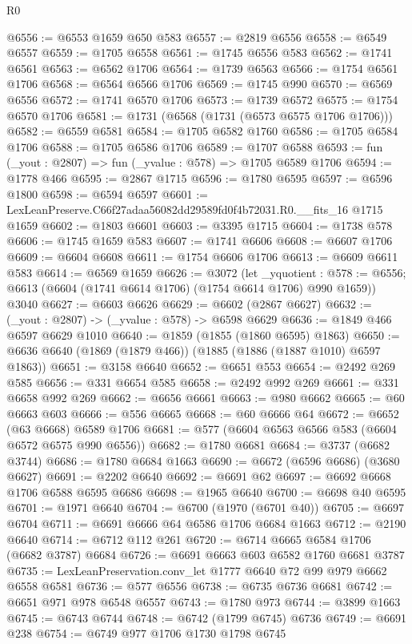 \begin{lexlean}{R0}
\begin{coremodule}
@6556 := @6553 @1659 @650 @583
@6557 := @2819 @6556
@6558 := @6549 @6557
@6559 := @1705 @6558
@6561 := @1745 @6556 @583
@6562 := @1741 @6561
@6563 := @6562 @1706
@6564 := @1739 @6563
@6566 := @1754 @6561 @1706
@6568 := @6564 @6566 @1706
@6569 := @1745 @990
@6570 := @6569 @6556
@6572 := @1741 @6570 @1706
@6573 := @1739 @6572
@6575 := @1754 @6570 @1706
@6581 := @1731 (@6568 (@1731 (@6573 @6575 @1706 @1706)))
@6582 := @6559 @6581
@6584 := @1705 @6582 @1760
@6586 := @1705 @6584 @1706
@6588 := @1705 @6586 @1706
@6589 := @1707 @6588
@6593 := fun (_yout : @2807) => fun (_yvalue : @578) => @1705 @6589 @1706
@6594 := @1778 @466
@6595 := @2867 @1715
@6596 := @1780 @6595
@6597 := @6596 @1800
@6598 := @6594 @6597
@6601 := LexLeanPreserve.C66f27adaa56082dd29589fd0f4b72031.R0.__fits_16 @1715 @1659
@6602 := @1803 @6601
@6603 := @3395 @1715
@6604 := @1738 @578
@6606 := @1745 @1659 @583
@6607 := @1741 @6606
@6608 := @6607 @1706
@6609 := @6604 @6608
@6611 := @1754 @6606 @1706
@6613 := @6609 @6611 @583
@6614 := @6569 @1659
@6626 := @3072
    (let _yquotient : @578 := @6556;
    @6613 (@6604 (@1741 @6614 @1706) (@1754 @6614 @1706) @990 @1659))
    @3040
@6627 := @6603 @6626
@6629 := @6602 (@2867 @6627)
@6632 := (_yout : @2807) -> (_yvalue : @578) -> @6598 @6629
@6636 := @1849 @466 @6597 @6629 @1010
@6640 := @1859 (@1855 (@1860 @6595) @1863)
@6650 := @6636 @6640 (@1869 (@1879 @466)) (@1885 (@1886 (@1887 @1010) @6597 @1863))
@6651 := @3158 @6640
@6652 := @6651 @553
@6654 := @2492 @269 @585
@6656 := @331 @6654 @585
@6658 := @2492 @992 @269
@6661 := @331 @6658 @992 @269
@6662 := @6656 @6661
@6663 := @980 @6662
@6665 := @60 @6663 @603
@6666 := @556 @6665
@6668 := @60 @6666 @64
@6672 := @6652 (@63 @6668) @6589 @1706
@6681 := @577 (@6604 @6563 @6566 @583 (@6604 @6572 @6575 @990 @6556))
@6682 := @1780 @6681
@6684 := @3737 (@6682 @3744)
@6686 := @1780 @6684 @1663
@6690 := @6672 (@6596 @6686) (@3680 @6627)
@6691 := @2202 @6640
@6692 := @6691 @62
@6697 := @6692 @6668 @1706 @6588 @6595 @6686
@6698 := @1965 @6640
@6700 := @6698 @40 @6595
@6701 := @1971 @6640
@6704 := @6700 (@1970 (@6701 @40))
@6705 := @6697 @6704
@6711 := @6691 @6666 @64 @6586 @1706 @6684 @1663
@6712 := @2190 @6640
@6714 := @6712 @112 @261
@6720 := @6714 @6665 @6584 @1706 (@6682 @3787) @6684
@6726 := @6691 @6663 @603 @6582 @1760 @6681 @3787
@6735 := LexLeanPreservation.conv_let @1777 @6640 @72 @99 @979 @6662 @6558 @6581
@6736 := @577 @6556
@6738 := @6735 @6736 @6681
@6742 := @6651 @971 @978 @6548 @6557
@6743 := @1780 @973
@6744 := @3899 @1663
@6745 := @6743 @6744
@6748 := @6742 (@1799 @6745) @6736
@6749 := @6691 @238
@6754 := @6749 @977 @1706 @1730 @1798 @6745

\end{coremodule}
\end{lexlean}
